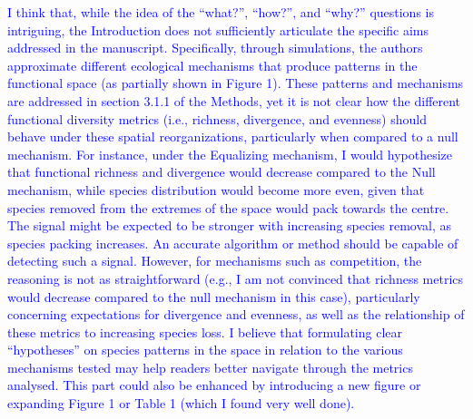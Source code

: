 \documentclass[
]{article}
\begin{document}
\textcolor{blue}{I think that, while the idea of the ``what?'', ``how?'', and ``why?'' questions is intriguing, the Introduction does not sufficiently articulate the specific aims addressed in the manuscript.
Specifically, through simulations, the authors approximate different ecological mechanisms that produce patterns in the functional space (as partially shown in Figure 1).
These patterns and mechanisms are addressed in section 3.1.1 of the Methods, yet it is not clear how the different functional diversity metrics (i.e., richness, divergence, and evenness) should behave under these spatial reorganizations, particularly when compared to a null mechanism.
For instance, under the Equalizing mechanism, I would hypothesize that functional richness and divergence would decrease compared to the Null mechanism, while species distribution would become more even, given that species removed from the extremes of the space would pack towards the centre.
The signal might be expected to be stronger with increasing species removal, as species packing increases.
An accurate algorithm or method should be capable of detecting such a signal.
However, for mechanisms such as competition, the reasoning is not as straightforward (e.g., I am not convinced that richness metrics would decrease compared to the null mechanism in this case), particularly concerning expectations for divergence and evenness, as well as the relationship of these metrics to increasing species loss.
I believe that formulating clear ``hypotheses'' on species patterns in the space in relation to the various mechanisms tested may help readers better navigate through the metrics analysed.
This part could also be enhanced by introducing a new figure or expanding Figure 1 or Table 1 (which I found very well done).}

\end{document}
